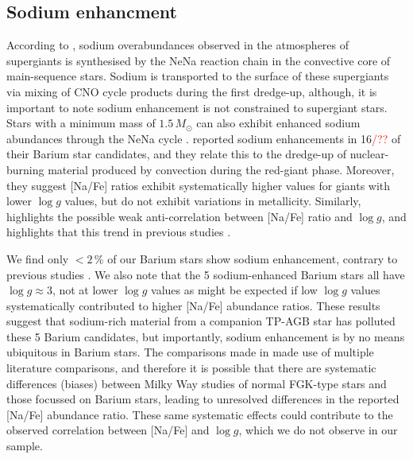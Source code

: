 \documentclass[a4paper,fleqn,usenatbib]{mnras}
\newcommand{\todo}[1]{\textcolor{red}{#1}}
\begin{document}
\subsection{Sodium enhancment}
According to \citet{el1995}, sodium overabundances observed in the atmospheres of supergiants is synthesised by the NeNa reaction chain in the convective core of main-sequence stars. Sodium is transported to the surface of these supergiants via mixing of CNO cycle products during the first dredge-up, although, it is important to note sodium enhancement is not constrained to supergiant stars. Stars with a  minimum mass of $1.5\,M_\odot$ can also exhibit enhanced sodium abundances through the NeNa cycle \citep{denissenkov1987}. \citet{antipova2004} reported sodium enhancements in 16\todo{/??} of their Barium star candidates, and they relate this to the dredge-up of nuclear-burning material produced by convection during the red-giant phase. Moreover, they suggest [Na/Fe] ratios exhibit systematically higher values for giants with lower $\log{g}$ values, but do not exhibit variations in metallicity. Similarly, \citet{decastro2016} highlights the possible weak anti-correlation between [Na/Fe] ratio and $\log{g}$, and highlights that this trend in previous studies \citep[e.g.][]{boyarchuk2002,mishenina2006,luck2007,takeda2008}.

We find only $<2$\,\% of our Barium stars show sodium enhancement, contrary to previous studies \citep[e.g.][]{decastro2016}. We also note that the 5 sodium-enhanced Barium stars all have $\log{g} \approx 3$, not at lower $\log{g}$ values as might be expected if low $\log{g}$ values systematically contributed to higher [Na/Fe] abundance ratios. These results suggest that sodium-rich material from a companion TP-AGB star has polluted these 5 Barium candidates, but importantly, sodium enhancement is by no means ubiquitous in Barium stars. The comparisons made in \citep{decastro2016} made use of multiple literature comparisons, and therefore it is possible that there are systematic differences (biases) between Milky Way studies of normal FGK-type stars and those focussed on Barium stars, leading to unresolved differences in the reported [Na/Fe] abundance ratio. These same systematic effects could contribute to the observed correlation between [Na/Fe] and $\log{g}$, which we do not observe in our sample.


\end{document}
